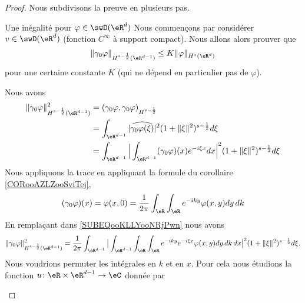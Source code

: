 \begin{proof}
    Nous subdivisons la preuve en plusieurs pas.
    \begin{subproof}
        \item[Une inégalité pour \( \varphi\in\swD(\eR^d)\)]
            Nous commençons par considérer \( v\in \swD(\eR^d)\) (fonction \(  C^{\infty}\) à support compact). Nous allons alors prouver que
            \begin{equation}
                \| \gamma_0\varphi \|_{H^{s-\frac{ 1 }{2}}(\eR^{d-1})}\leq K\| \varphi \|_{H^s(\eR^d)}
            \end{equation}
            pour une certaine constante \( K\) (qui ne dépend en particulier pas de \( \varphi\)).

            Nous avons
            \begin{subequations}
                \begin{align}
                    \| \gamma_0\varphi \|^2_{H^{s-\frac{ 1 }{2}}(\eR^{d-1})}&=(  \gamma_0\varphi,\gamma_0\varphi  )_{H^{s-\frac{ 1 }{2}}}\\
                    &=\int_{\eR^{d-1}}| \widehat{\gamma_0\varphi(\xi)} |^2(1+\| \xi \|^2)^{s-\frac{ 1 }{2}}d\xi\\
                    &=\int_{\eR^{d-1}}\Big| \int_{\eR^{d-1}}(\gamma_0\varphi)(x) e^{-i\xi x}dx \Big|^2(1+\| \xi \|^2)^{s-\frac{ 1 }{2}}d\xi \label{SUBEQooKLLYooNRjPwn} \\
                \end{align}
            \end{subequations}
            Nous appliquons la trace en appliquant la formule du corollaire \ref{CORooAZLZooSviTej},
            \begin{equation}
                (\gamma_0\varphi)(x)= \varphi(x,0) =\frac{1}{ 2\pi }\int_{\eR}\int_{\eR} e^{-iky}\varphi(x,y)dy\,dk
            \end{equation}
            En remplaçant dans \eqref{SUBEQooKLLYooNRjPwn} nous avons
            \begin{equation}
                \| \gamma_0\varphi \|^2_{H^{s-\frac{ 1 }{2}}(\eR^{d-1})}=\frac{1}{ 2\pi }\int_{\eR^{d-1}}\big| \int_{\eR^{d-1}}\int_{\eR}\int_{\eR} e^{-iky} e^{-i\xi x}\varphi(x,y)dy\,dk\,dx \big|^2(1+\| \xi \|^2)^{s-\frac{ 1 }{2}}d\xi.
            \end{equation}
            Nous voudrions permuter les intégrales en \( k\) et en \( x\). Pour cela nous étudions la fonction \( u\colon \eR\times \eR^{d-1}\to \eC\) donnée par
            \begin{equation}

\end{equation}
\end{subproof}
\end{proof}
